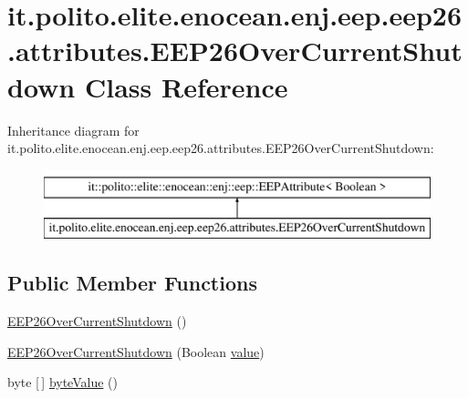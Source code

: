 \hypertarget{classit_1_1polito_1_1elite_1_1enocean_1_1enj_1_1eep_1_1eep26_1_1attributes_1_1_e_e_p26_over_current_shutdown}{}\section{it.\+polito.\+elite.\+enocean.\+enj.\+eep.\+eep26.\+attributes.\+E\+E\+P26\+Over\+Current\+Shutdown Class Reference}
\label{classit_1_1polito_1_1elite_1_1enocean_1_1enj_1_1eep_1_1eep26_1_1attributes_1_1_e_e_p26_over_current_shutdown}
Inheritance diagram for it.\+polito.\+elite.\+enocean.\+enj.\+eep.\+eep26.\+attributes.\+E\+E\+P26\+Over\+Current\+Shutdown\+:\begin{figure}[H]
\begin{center}
\leavevmode
\includegraphics[height=2.000000cm]{classit_1_1polito_1_1elite_1_1enocean_1_1enj_1_1eep_1_1eep26_1_1attributes_1_1_e_e_p26_over_current_shutdown}
\end{center}
\end{figure}
\subsection*{Public Member Functions}
\begin{DoxyCompactItemize}
\item 
\hyperlink{classit_1_1polito_1_1elite_1_1enocean_1_1enj_1_1eep_1_1eep26_1_1attributes_1_1_e_e_p26_over_current_shutdown_a8ba70c146c7e62e283b7ffd2a1bb36ed}{E\+E\+P26\+Over\+Current\+Shutdown} ()
\item 
\hyperlink{classit_1_1polito_1_1elite_1_1enocean_1_1enj_1_1eep_1_1eep26_1_1attributes_1_1_e_e_p26_over_current_shutdown_abe903a6d8942ebbc6f161bd6694478f5}{E\+E\+P26\+Over\+Current\+Shutdown} (Boolean \hyperlink{classit_1_1polito_1_1elite_1_1enocean_1_1enj_1_1eep_1_1_e_e_p_attribute_af4d7e34642004bb6ccfae51e925c983d}{value})
\item 
byte \mbox{[}$\,$\mbox{]} \hyperlink{classit_1_1polito_1_1elite_1_1enocean_1_1enj_1_1eep_1_1eep26_1_1attributes_1_1_e_e_p26_over_current_shutdown_a8994ca8b4d8a15d46d234cb652ae959b}{byte\+Value} ()
\end{DoxyCompactItemize}
